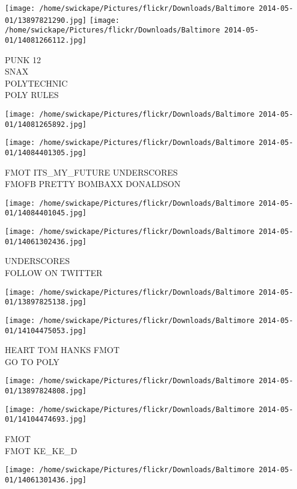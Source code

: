 \documentclass[10pt,letterpaper]{article}
\begin{document}
\texttt{[image: /home/swickape/Pictures/flickr/Downloads/Baltimore 2014-05-01/13897821290.jpg]}
\texttt{[image: /home/swickape/Pictures/flickr/Downloads/Baltimore 2014-05-01/14081266112.jpg]}

PUNK 12\\
SNAX\\
POLYTECHNIC\\
POLY RULES
\pagebreak

\texttt{[image: /home/swickape/Pictures/flickr/Downloads/Baltimore 2014-05-01/14081265892.jpg]}

\vspace{0.25in}
\texttt{[image: /home/swickape/Pictures/flickr/Downloads/Baltimore 2014-05-01/14084401305.jpg]}

FMOT ITS\_MY\_FUTURE UNDERSCORES\\
FMOFB PRETTY BOMBAXX DONALDSON
\pagebreak

\texttt{[image: /home/swickape/Pictures/flickr/Downloads/Baltimore 2014-05-01/14084401045.jpg]}

\vspace{0.25in}
\texttt{[image: /home/swickape/Pictures/flickr/Downloads/Baltimore 2014-05-01/14061302436.jpg]}

UNDERSCORES\\
FOLLOW ON TWITTER
\pagebreak

\texttt{[image: /home/swickape/Pictures/flickr/Downloads/Baltimore 2014-05-01/13897825138.jpg]}

\vspace{0.25in}
\texttt{[image: /home/swickape/Pictures/flickr/Downloads/Baltimore 2014-05-01/14104475053.jpg]}

HEART TOM HANKS FMOT\\
GO TO POLY
\pagebreak

\texttt{[image: /home/swickape/Pictures/flickr/Downloads/Baltimore 2014-05-01/13897824808.jpg]}

\vspace{0.25in}
\texttt{[image: /home/swickape/Pictures/flickr/Downloads/Baltimore 2014-05-01/14104474693.jpg]}

FMOT\\
FMOT KE\_KE\_D
\pagebreak

\texttt{[image: /home/swickape/Pictures/flickr/Downloads/Baltimore 2014-05-01/14061301436.jpg]}
\end{document}
